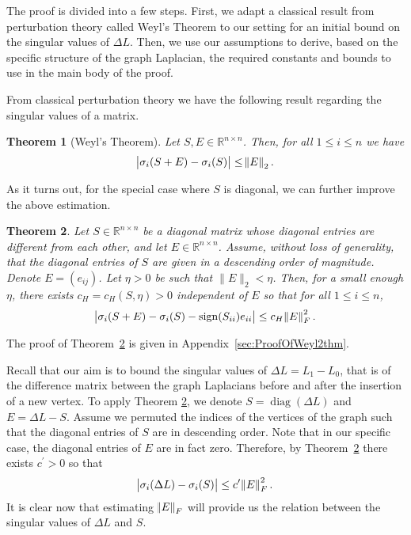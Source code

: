 \documentclass[11pt]{article}
\newtheorem{theorem}{Theorem}[section]
\begin{document}
The proof is divided into a few steps. First, we adapt a classical result from perturbation theory called Weyl's Theorem \cite{stewart1998perturbation} to our setting for an initial bound on the singular values of $\Delta L$. Then, we use our assumptions to derive, based on the specific structure of the graph Laplacian, the required constants and bounds to use in the main body of the proof.

From classical perturbation theory we have the following result regarding the singular values of a matrix.
\begin{theorem}[Weyl's Theorem] \label{thm:weyl}
Let $S,E \in \mathbb{R}^{n \times n}$. Then, for all $1 \leq i \leq n$ we have
\[ \abs{\sigma_i(S+E) - \sigma_i(S)} \leq \norm{E}_2. \]
\end{theorem}
As it turns out, for the special case where $S$ is diagonal, we can further improve the above estimation.
\begin{theorem} \label{thm:extendweyl}
Let $S\in \mathbb{R}^{n \times  n}$ be a diagonal matrix whose diagonal entries are different from each other, and let $E \in \mathbb{R}^{n \times 
n}$. Assume, without loss of generality, that the diagonal entries of $S$ are given in a descending order of magnitude. Denote $E = \left( e_{ij}\right)$. Let $\eta > 0$ be such that $\|E\|_2 < \eta$. Then, for a small enough $\eta$, there exists $c_H = c_H(S, \eta) > 0$ independent of $E$ so that for all $1 \leq i \leq n$,
\[ \abs{\sigma_i(S+E) - \sigma_i(S) -  \operatorname{sign}(S_{ii})e_{ii}} \leq  c_H \norm{E}^2_F . \]
\end{theorem}	
The proof of Theorem~\ref{thm:extendweyl} is given in Appendix~\ref{sec:ProofOfWeyl2thm}.

Recall that our aim is to bound the singular values of $\Delta L = L_1 - L_0$, that is of the difference matrix between the graph Laplacians before and after the insertion of a new vertex. To apply Theorem \ref{thm:extendweyl}, we denote $S = \operatorname{diag}(\Delta L)$ and $E = \Delta L - S$. Assume we permuted the indices of the vertices of the graph such that the diagonal entries of $S$ are in descending order. Note that in our specific case, the diagonal entries of $E$ are in fact zero. Therefore, by Theorem~\ref{thm:extendweyl} there exists $c^\prime>0$ so that
\begin{equation} \label{eqn:dls}
\abs{\sigma_i(\Delta L) - \sigma_i(S)} \leq  c^\prime \norm{E}^2_F.
\end{equation}
It is clear now that estimating $\norm{E}_F$ will provide us the relation between the singular values of $\Delta L$ and $S$. 
\end{document}
